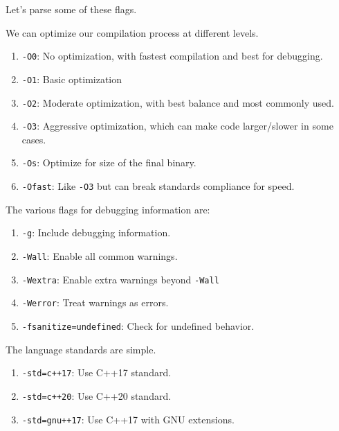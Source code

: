 \documentclass{article}
\begin{document}
      Let's parse some of these flags. 

      \begin{definition}
        We can optimize our compilation process at different levels. 
        \begin{enumerate}
          \item \texttt{-O0}: No optimization, with fastest compilation and best for debugging. 
          \item \texttt{-O1}: Basic optimization 
          \item \texttt{-O2}: Moderate optimization, with best balance and most commonly used. 
          \item \texttt{-O3}: Aggressive optimization, which can make code larger/slower in some cases. 
          \item \texttt{-Os}: Optimize for size of the final binary. 
          \item \texttt{-Ofast}: Like \texttt{-O3} but can break standards compliance for speed. 
        \end{enumerate}
      \end{definition}

      \begin{definition}
        The various flags for debugging information are: 
        \begin{enumerate}
          \item \texttt{-g}: Include debugging information. 
          \item \texttt{-Wall}: Enable all common warnings. 
          \item \texttt{-Wextra}: Enable extra warnings beyond \texttt{-Wall} 
          \item \texttt{-Werror}: Treat warnings as errors. 
          \item \texttt{-fsanitize=undefined}: Check for undefined behavior. 
        \end{enumerate}
      \end{definition} 

      \begin{definition}
        The language standards are simple. 
        \begin{enumerate}
          \item \texttt{-std=c++17}: Use C++17 standard. 
          \item \texttt{-std=c++20}: Use C++20 standard. 
          \item \texttt{-std=gnu++17}: Use C++17 with GNU extensions. 
        \end{enumerate}
      \end{definition}
\end{document}
